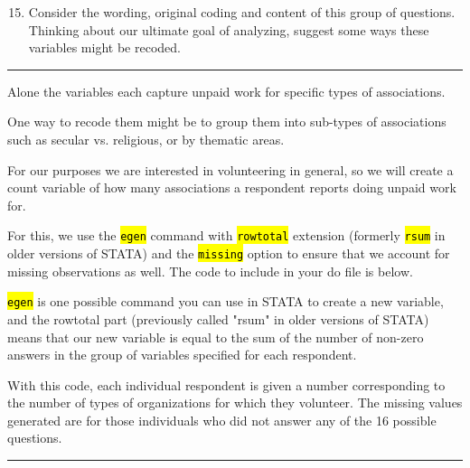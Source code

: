 \documentclass{tufte-handout}
\begin{document}
\begin{enumerate}[leftmargin=.5in]
\setcounter{enumi}{14}
	\item Consider the wording, original coding and content of this group of questions. Thinking about our ultimate goal of analyzing, suggest some ways these variables might be recoded. 
\end{enumerate}

\bigskip
\hrule
\bigskip

\medskip
{}
\medskip


Alone the variables each capture unpaid work for specific types of associations.

One way to recode them might be to group them into sub-types of associations such as secular vs. religious, or by thematic areas.

For our purposes we are interested in volunteering in general, so we will create a count variable of how many associations a respondent reports doing unpaid work for.

For this, we use the {\tt \hl{egen}} command with {\tt \hl{rowtotal}} extension (formerly {\tt \hl{rsum}} in older versions of STATA) and the {\tt \hl{missing}} option to ensure that we account for missing observations as well. The code to include in your do file is below.

\bigskip
{}
\bigskip

{\tt \hl{egen}} is one possible command you can use in STATA to create a new variable, and the rowtotal part (previously called "rsum" in older versions of STATA) means that our new variable is equal to the sum of the number of non-zero answers in the group of variables specified for each respondent.

With this code, each individual respondent is given a number corresponding to the number of types of organizations for which they volunteer. The missing values generated are for those individuals who did not answer any of the 16 possible questions. 

\bigskip
\hrule
\bigskip
\end{document}
